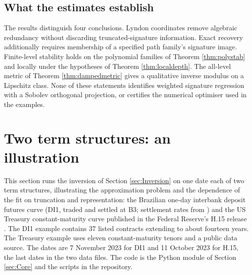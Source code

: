 \documentclass[11pt,english]{article}
\theoremstyle{definition}
\theoremstyle{remark}
\begin{document}
\subsection{What the estimates establish}

The results distinguish four conclusions. Lyndon coordinates remove
algebraic redundancy without discarding truncated-signature
information. Exact recovery additionally requires membership of a
specified path family's signature image. Finite-level stability
holds on the polynomial families of Theorem \ref{thm:polystab} and
locally under the hypotheses of Theorem \ref{thm:localdepth}.
The all-level metric of Theorem \ref{thm:dampedmetric} gives a
qualitative inverse modulus on a Lipschitz class. None of these
statements identifies weighted signature regression with a Sobolev
orthogonal projection, or certifies the numerical optimiser used in
the examples.

\section{Two term structures: an illustration\label{sec:Curves}}

This section runs the inversion of Section \ref{sec:Inversion} on one
date each of two term structures, illustrating the approximation
problem and the dependence of the fit on truncation and representation: the Brazilian one-day interbank deposit futures curve
(DI1, traded and settled at B3; settlement rates from \cite{b3data})
and the US Treasury constant-maturity curve published in the Federal
Reserve's H.15 release \cite{h15data}. The DI1 example contains 37 listed contracts extending to about
fourteen years. The Treasury example uses eleven constant-maturity
tenors and a public data source. The dates are 7 November 2023 for DI1 and
11 October 2023 for H.15, the last dates in the two data files. The code
is the Python module of Section \ref{sec:Core} and the scripts in the
repository.
\end{document}
